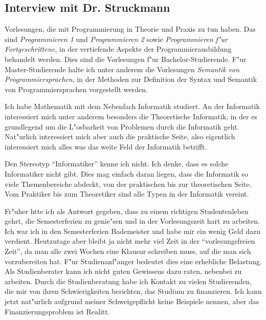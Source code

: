 \subsection{Interview mit Dr. Struckmann}


Vorlesungen, die mit Programmierung in Theorie und Praxis zu tun haben.
Das sind \emph{Programmieren 1} und \emph{Programmieren 2} sowie \emph{Programmieren f"ur Fortgeschrittene}, in der vertiefende Aspekte der Programmierausbildung behandelt werden.
Dies sind die Vorlesungen f"ur Bachelor-Studierende.
F"ur Master-Studierende halte ich unter anderem die Vorlesungen \emph{Semantik von Programmiersprachen}, in der Methoden zur Definition der Syntax und Semantik von Programmiersprachen vorgestellt werden.


Ich habe Mathematik mit dem Nebenfach Informatik studiert.
An der Informatik interessiert mich unter anderem besonders die Theoretische Informatik, in der es grundlegend um die L"osbarkeit von Problemen durch die Informatik geht.
Nat"urlich interessiert mich aber auch die praktische Seite, also eigentlich interessiert mich alles was das weite Feld der Informatik betrifft.


Den Stereotyp "`Informatiker"' kenne ich nicht.
Ich denke, dass es solche Informatiker nicht gibt.
Dies mag einfach daran liegen, dass die Informatik so viele Themenbereiche abdeckt, von der praktischen bis zur theoretischen Seite.
Vom Praktiker bis zum Theoretiker sind alle Typen in der Informatik vereint.


Fr"uher htte ich als Antwort gegeben, dass zu einem richtigen Studentenleben gehrt, die Semesterferien zu genie"sen und in der Vorlesungszeit hart zu arbeiten.
Ich war ich in den Semesterferien Bademeister und habe mir ein wenig Geld dazu verdient.
Heutzutage aber bleibt ja nicht mehr viel Zeit in der "`vorlesungsfreien Zeit"', da man alle zwei Wochen eine Klausur schreiben muss, auf die man sich vorzubereiten hat.
F"ur Studienanf"anger bedeutet dies eine erhebliche Belastung.
Als Studienberater kann ich nicht guten Gewissens dazu raten, nebenbei zu arbeiten.
Durch die Studienberatung habe ich Kontakt zu vielen Studierenden, die mir von ihren Schwierigkeiten berichten, das Studium zu finanzieren.
Ich kann jetzt nat"urlich aufgrund meiner Schweigepflicht keine Beispiele nennen, aber das Finanzierungsproblem ist Realitt.

